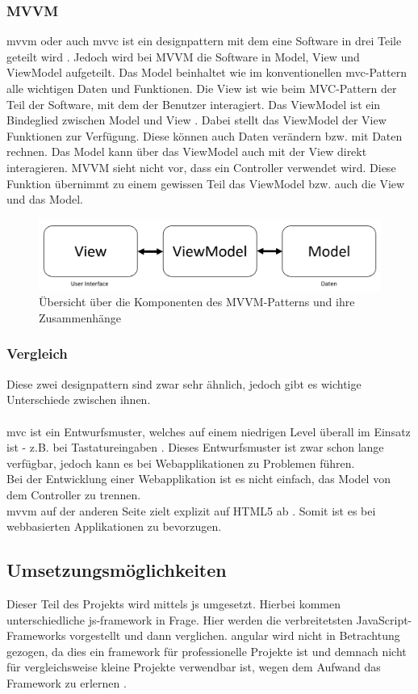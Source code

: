 \subsubsection{MVVM}
\Gls{mvvm} oder auch \Gls{mvvc} ist ein \Gls{designpattern} mit dem eine Software in drei Teile geteilt wird \cite{mvvm_vue}. Jedoch wird bei MVVM die Software in Model, View und ViewModel aufgeteilt. 
Das Model beinhaltet wie im konventionellen \Gls{mvc}-Pattern alle wichtigen Daten und Funktionen. 
Die View ist wie beim MVC-Pattern der Teil der Software, mit dem der Benutzer interagiert. 
Das ViewModel ist ein Bindeglied zwischen Model und View \cite{mvvm_vue}. Dabei stellt das ViewModel der View Funktionen zur Verfügung. Diese können auch Daten verändern bzw. mit Daten rechnen. Das Model kann über das ViewModel auch mit der View direkt interagieren. 
MVVM sieht nicht vor, dass ein Controller verwendet wird. Diese Funktion übernimmt zu einem gewissen Teil das ViewModel bzw. auch die View und das Model.
\begin{figure}[H]
	\centering
	\includegraphics[width=0.8\linewidth]{images/mvvm}
	\caption[Übersicht des MVVM-Patterns]{Übersicht über die Komponenten des MVVM-Patterns und ihre Zusammenhänge}
	\label{fig:mvvm}
\end{figure}
\newpage
\subsubsection{Vergleich}
Diese zwei \Gls{designpattern} sind zwar sehr ähnlich, jedoch gibt es wichtige Unterschiede zwischen ihnen.\\\\
\Gls{mvc} ist ein Entwurfsmuster, welches auf einem niedrigen Level überall im Einsatz ist - z.B. bei Tastatureingaben \cite{mvc}. Dieses Entwurfsmuster ist zwar schon lange verfügbar, jedoch kann es bei Webapplikationen zu Problemen führen.\\
Bei der Entwicklung einer Webapplikation ist es nicht einfach, das Model von dem Controller zu trennen.\\
\Gls{mvvm} auf der anderen Seite zielt explizit auf HTML5 ab \cite{mvvm_vue}. Somit ist es bei webbasierten Applikationen zu bevorzugen.
\subsection{Umsetzungsmöglichkeiten}
Dieser Teil des Projekts wird mittels \Gls{js} umgesetzt. Hierbei kommen unterschiedliche \Gls{js}-\Gls{framework} in Frage. Hier werden die verbreitetsten JavaScript-Frameworks vorgestellt und dann verglichen. \Gls{angular} wird nicht in Betrachtung gezogen, da dies ein \Gls{framework} für professionelle Projekte ist und demnach nicht für vergleichsweise kleine Projekte verwendbar ist, wegen dem Aufwand das Framework zu erlernen \cite{angular_ex}.
